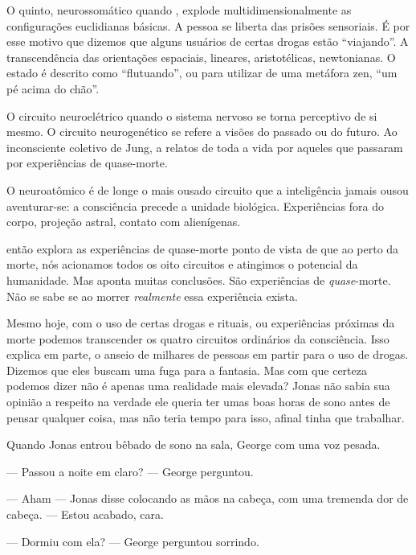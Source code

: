 O quinto,  neurossomático\mudanca{,} quando , explode multidimensionalmente as configurações euclidianas básicas. A pessoa se liberta das prisões sensoriais. É por esse motivo que dizemos que alguns usuários de certas drogas estão ``viajando''. A transcendência das orientações espaciais, lineares, aristotélicas, newtonianas. O estado é descrito como ``flutuando'', ou\mudanca{,} para utilizar de uma metáfora zen, ``um pé acima do chão''.

O circuito neuroelétrico  quando o sistema nervoso se torna perceptivo de si mesmo. O circuito neurogenético se refere a visões do passado ou do futuro. Ao inconsciente coletivo de Jung, a relatos de toda a vida por aqueles que passaram por experiências de quase-morte.

O neuroatômico é de longe o mais ousado circuito que a inteligência jamais ousou aventurar-se: a consciência precede a unidade biológica. Experiências fora do corpo, projeção astral, contato com alienígenas.

 então\mudanca{,} explora as experiências de quase-morte  ponto de vista de que\mudanca{,} ao  perto da morte, nós acionamos todos os oito circuitos e atingimos o potencial da humanidade. Mas  aponta muitas conclusões. São experiências de \emph{quase}-morte. Não se sabe se\mudanca{,} ao morrer \emph{realmente}\mudanca{,} essa experiência exista.

Mesmo hoje, com o uso de certas drogas e rituais, ou experiências próximas da morte\mudanca{,} podemos transcender os quatro circuitos ordinários da consciência. Isso explica\mudanca{,} em parte, o anseio de milhares de pessoas em partir para o uso de drogas. Dizemos que eles buscam uma fuga para a fantasia. Mas com que certeza podemos dizer  não é apenas uma realidade mais elevada? Jonas não sabia sua opinião a respeito\mudanca{;} na verdade\mudanca{,} ele queria ter umas boas horas de sono antes de pensar qualquer coisa, mas não teria tempo para isso, afinal tinha que trabalhar.

Quando Jonas entrou bêbado de sono na sala,  George com uma voz pesada.

--- Passou a noite em claro? --- George perguntou.

--- Aham --- Jonas disse\mudanca{,} colocando as mãos na cabeça, com uma tremenda dor de cabeça. --- Estou acabado, cara.

--- Dormiu com ela? --- George perguntou\mudanca{,} sorrindo.

